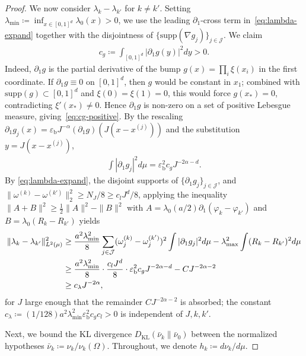 \documentclass[11pt,reqno]{amsart}
\theoremstyle{definition}
\newcommand{\KL}{\mathrm{KL}}
\newcommand{\mJ}{\mathcal{J}}
\newcommand{\supp}{\mathrm{supp}}
\begin{document}
\begin{proof}
We now consider $\lambda_k - \lambda_{k'}$ for $k\ne k'$. Setting $\lambda_{\min}\coloneqq\inf_{x \in [0,1]^d}\lambda_0(x) >0$, we use the leading $\partial_1$-cross term in~\eqref{eq:lambda-expand} together with the disjointness of $\{\supp(\nabla g_j)\}_{j\in\mJ}$. We claim
\begin{align}
    \label{eq:cg-positive}
    c_g \coloneqq \int_{[0,1]^d}|\partial_1 g(y)|^2 dy  >  0.
\end{align}
Indeed, $\partial_1 g$ is the partial derivative of the bump $g(x)=\prod_i\xi(x_i)$ in the first coordinate. If $\partial_1 g\equiv 0$ on $[0,1]^d$, then $g$ would be constant in $x_1$; combined with $\supp(g)\subset[0,1]^d$ and $\xi(0)=\xi(1)=0$, this would force $g(x_*)=0$, contradicting $\xi'(x_*)\ne 0$. Hence $\partial_1 g$ is non-zero on a set of positive Lebesgue measure, giving~\eqref{eq:cg-positive}. By the rescaling $\partial_1 g_j(x)=\varepsilon_{\mathrm b} J^{-\alpha}(\partial_1 g)(J(x-x^{(j)}))$ and the substitution $y=J(x-x^{(j)})$,
\begin{align}
    \int|\partial_1 g_j|^2 d\mu = \varepsilon_{\mathrm b}^2 c_g J^{-2\alpha-d}.
\end{align}
By \eqref{eq:lambda-expand}, the disjoint supports of $\{\partial_1 g_j\}_{j\in\mJ}$, and $\|\omega^{(k)}-\omega^{(k')}\|_2^2\ge N_J/8\ge c_l J^d/8$, applying the inequality $\|A+B\|^2\ge\frac1{2}\|A\|^2-\|B\|^2$ with $A=\lambda_0(a/2)\partial_1(\varphi_k-\varphi_{k'})$ and $B=\lambda_0(R_k-R_{k'})$ yields
\begin{align}
    \label{eq:lambda-sep}
    \|\lambda_k-\lambda_{k'}\|_{L^2(\mu)}^2
    &\ge \frac{a^2\lambda_{\min}^2}{8}\sum_{j\in\mJ}(\omega_j^{(k)}-\omega_j^{(k')})^2 \int|\partial_1 g_j|^2 d\mu - \lambda_{\max}^2 \int(R_k-R_{k'})^2 d\mu \notag\\
    &\ge \frac{a^2\lambda_{\min}^2}{8}\cdot\frac{c_l J^d}{8}\cdot\varepsilon_{\mathrm b}^2 c_g J^{-2\alpha-d} - C J^{-2\alpha-2} \notag\\
    &\ge c_\lambda J^{-2\alpha},
\end{align}
for $J$ large enough that the remainder $C J^{-2\alpha-2}$ is absorbed; the constant $c_\lambda\coloneqq(1/128) a^2\lambda_{\min}^2\varepsilon_{\mathrm b}^2 c_g c_l>0$ is independent of $J,k,k'$.

Next, we bound the KL divergence $D_\KL(\bar\nu_k\|\bar\nu_0)$ between the normalized hypotheses $\bar\nu_k\coloneqq\nu_k/\nu_k(\Omega)$. Throughout, we denote $h_k\coloneqq d\nu_k/d\mu$.


\end{proof}
\end{document}
